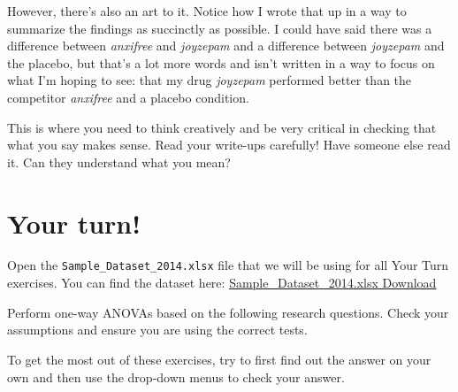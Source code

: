 \documentclass[
]{book}
\begin{document}
However, there's also an art to it. Notice how I wrote that up in a way to summarize the findings as succinctly as possible. I could have said there was a difference between \emph{anxifree} and \emph{joyzepam} and a difference between \emph{joyzepam} and the placebo, but that's a lot more words and isn't written in a way to focus on what I'm hoping to see: that my drug \emph{joyzepam} performed better than the competitor \emph{anxifree} and a placebo condition.

This is where you need to think creatively and be very critical in checking that what you say makes sense. Read your write-ups carefully! Have someone else read it. Can they understand what you mean?

\hypertarget{your-turn-2}{%
\section{Your turn!}\label{your-turn-2}}

Open the \texttt{Sample\_Dataset\_2014.xlsx} file that we will be using for all Your Turn exercises. You can find the dataset here: \href{https://github.com/danawanzer/stats-with-jamovi/blob/master/data/Sample_Dataset_2014.xlsx}{Sample\_Dataset\_2014.xlsx Download}

Perform one-way ANOVAs based on the following research questions. Check your assumptions and ensure you are using the correct tests.

To get the most out of these exercises, try to first find out the answer on your own and then use the drop-down menus to check your answer.
\end{document}
